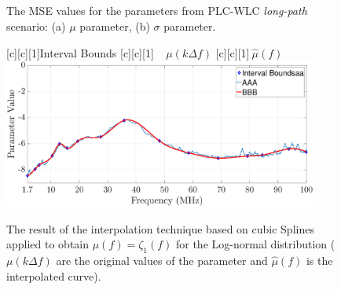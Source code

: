 \begin{figure}[h!]
	\centering
	\\~\\
	\\~\\
	\caption{The MSE values for the parameters from PLC-WLC \textit{long-path} scenario: (a) $\mu$ parameter, (b) $\sigma$ parameter.}
	\label{fig:boundsLW}
\end{figure}

\begin{figure}[h]
	\centering
	[c][1]{Interval Bounds}
	[c][1]{$~~~~~\mu(k \Delta f)$}
	[c][1]{$~\hat{\mu}(f)$}
	\includegraphics[width=0.92\textwidth]{images/Alfa_fitlW.eps}
	\caption{The result of the interpolation technique based on cubic Splines applied to obtain $\mu(f)=\zeta_1(f)$ for the Log-normal distribution (${\mu}(k \Delta f)$ are the original values of the parameter and $\hat{\mu}(f)$ is the interpolated curve).}
	\label{Fit_alfalW}
\end{figure}


